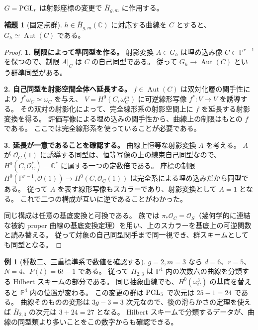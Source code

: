\documentclass[dvipdfmx,a4paper,11pt]{article}
\theoremstyle{definition}
\newtheorem{lem}[thm]{補題}
\newtheorem{exa}[thm]{例}
\newcommand{\C}{\mathbb C}\newcommand{\R}{\mathbb R}\newcommand{\Z}{\mathbb Z}\newcommand{\Q}{\mathbb Q}
\newcommand{\PP}{\mathbb P}\newcommand{\HH}{\mathbb H}
\newcommand{\OO}{\mathcal O}\newcommand{\MM}{\mathcal M}\newcommand{\TT}{\mathcal T}
\DeclareMathOperator{\Aut}{Aut}\DeclareMathOperator{\Pic}{Pic}\DeclareMathOperator{\Hom}{Hom}
\begin{document}
$G=\operatorname{PGL}_r$ は射影座標の変更で $\overline H_{g,m}$ に作用する。
\begin{lem}[固定点群]\label{lem:hilbstab}
$h\in\overline H_{g,m}(\C)$ に対応する曲線を $C$ とすると、$G_h\simeq\Aut(C)$ である。
\end{lem}
\begin{proof}
\textbf{1. 制限によって準同型を作る。}
射影変換 $A\in G_h$ は埋め込み像 $C\subset\PP^{r-1}$ を保つので、制限 $A|_C$ は $C$ の自己同型である。
従って $G_h\to\Aut(C)$ という群準同型がある。

\textbf{2. 自己同型を射影空間全体へ延長する。}
$f\in\Aut(C)$ は双対化層の関手性により $f^*\omega_C\simeq\omega_C$ を与え、
$V=H^0(C,\omega_C^m)$ に可逆線形写像 $f^*:V\to V$ を誘導する。
その双対の射影化によって、完全線形系の射影空間上に $f$ を延長する射影変換を得る。
評価写像による埋め込みの関手性から、曲線上の制限はもとの $f$ である。
ここでは完全線形系を使っていることが必要である。

\textbf{3. 延長が一意であることを確認する。}
曲線上恒等な射影変換 $A$ を考える。
$A$ が $\OO_C(1)$ に誘導する同型は、恒等写像の上の線束自己同型なので、
$H^0(C,\OO_C^*)=\C^*$ に属する一つの定数倍である。
座標の制限 $H^0(\PP^{r-1},\OO(1))\to H^0(C,\OO_C(1))$ は完全系による埋め込みだから同型である。
従って $A$ を表す線形写像もスカラーであり、射影変換として $A=1$ となる。
これで二つの構成が互いに逆であることがわかった。

同じ構成は任意の基底変換と可換である。
族では $\pi_*\OO_C=\OO_S$（幾何学的に連結な被約 proper 曲線の基底変換定理）を用い、上のスカラーを基底上の可逆関数と読み替える。
従って対象の自己同型関手まで同一視でき、群スキームとしても同型となる。
\end{proof}

\begin{exa}[種数二、三重標準系で数値を確認する]
$g=2,m=3$ なら $d=6$、$r=5$、$N=4$、$P(t)=6t-1$ である。
従って $\overline H_{2,3}$ は $\PP^4$ 内の次数六の曲線を分類する Hilbert スキームの部分である。
同じ抽象曲線でも、$H^0(\omega_C^3)$ の基底を替えると $\PP^4$ 内の位置が変わる。
この変更の群は $\operatorname{PGL}_5$ で次元は $25-1=24$ である。
曲線そのものの変形は $3g-3=3$ 次元なので、後の滑らかさの定理を使えば $\overline H_{2,3}$ の次元は $3+24=27$ となる。
Hilbert スキームで分類するデータが、曲線の同型類より多いことをこの数字からも確認できる。
\end{exa}
\end{document}
